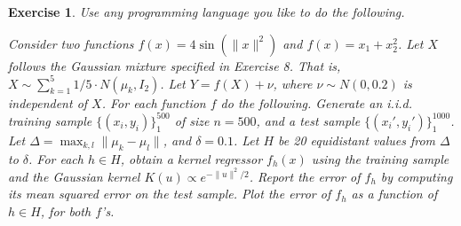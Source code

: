 \documentclass[12pt]{article}
\theoremstyle{colon}
\newtheorem{exercise}{Exercise}
\begin{document}
\begin{exercise}
  Use any programming language you like to do the following.

  Consider two functions $f(x) = 4 \sin( \lVert x \rVert^2)$ and $f(x) = x_1 +x_2^2$. Let $X$ follows the Gaussian mixture specified in Exercise 8. That is, $X \sim \sum_{k = 1}^5 1/5 \cdot N(\mu_k, I_2)$. Let $Y = f(X) + \nu$, where $\nu \sim N(0,0.2)$ is independent of $X$. For each function $f$ do the following. Generate an i.i.d. training sample $\{ (x_i, y_i) \}_1^500$ of size $n=500$, and a test sample $\{ (x_i', y_i') \}_1^1000$. Let $\Delta = \max_{k,l} \lVert \mu_k - \mu_l \rVert$, and $\delta = 0.1$. Let $H$ be 20 equidistant values from $\Delta$ to $\delta$. For each $h \in H$, obtain a kernel regressor $f_h(x)$ using the training sample and the Gaussian kernel $K(u) \propto e^{- \lVert u \rVert^2/2}$. Report the error of $f_h$ by computing its mean squared error on the test sample. Plot the error of $f_h$ as a function of $h \in H$, for both $f$'s.
\end{exercise}
\end{document}
